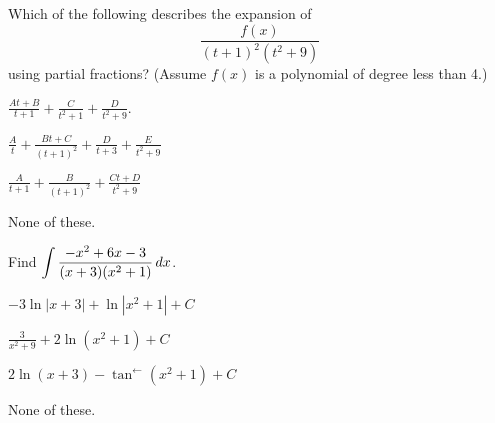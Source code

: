 \documentclass[12pt]{exam}
\newcommand{\ds}{\ensuremath{\displaystyle}}
\newcommand{\<}{(}
\renewcommand{\>}{)}
\begin{document}
\begin{center}
\end{center}
\vspace{0.1in}

\vspace{12pt}

\begin{questions}\setcounter{question}{8}

\question
Which of the following describes the expansion of
\[\frac{f(x)}{(t+1)^2(t^2+9)}\] using partial fractions?
(Assume \(f(x)\) is a polynomial of degree less than 4.)
\begin{choices}
\item \(\frac{At+B}{t+1}+\frac{C}{t^2+1}+\frac{D}{t^2+9}\).
\item \(\frac{A}{t}+\frac{Bt+C}{(t+1)^2}+\frac{D}{t+3}+\frac{E}{t^2+9}\)
\item \(\frac{A}{t+1}+\frac{B}{(t+1)^2}+\frac{Ct+D}{t^2+9}\)
\item None of these.
\end{choices}

\question
Find \(\ds\int \frac{-x^2+6x-3}{(x+3)(x^2+1)}\,dx\).
\begin{choices}
\item \(-3\ln|x+3|+\ln|x^2+1|+C\)
\item \(\frac{3}{x^2+9}+2\ln(x^2+1)+C\)
\item \(2\ln(x+3)-\tan^{\leftarrow}(x^2+1)+C\)
\item None of these.
\end{choices}



\end{questions}
\end{document}

